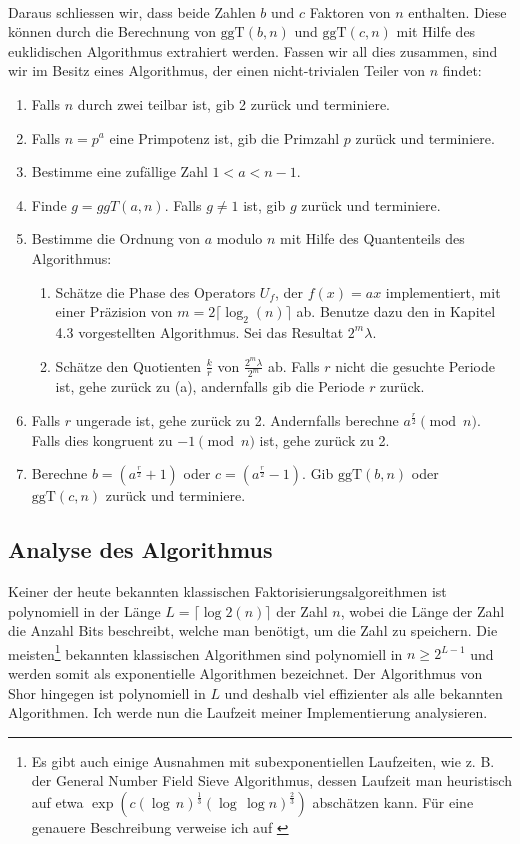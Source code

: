 \paragraph{}
Daraus schliessen wir, dass beide Zahlen $b$ und $c$ Faktoren von $n$ enthalten. Diese können durch die Berechnung von $\text{ggT}(b, n)$ und $\text{ggT}(c, n)$ mit Hilfe des euklidischen Algorithmus extrahiert werden. Fassen wir all dies zusammen, sind wir im Besitz eines Algorithmus, der einen nicht-trivialen Teiler von $n$ findet:
\begin{enumerate}
    \item Falls $n$ durch zwei teilbar ist, gib 2 zurück und terminiere.
    \item Falls $n = p^a$ eine Primpotenz ist, gib die Primzahl $p$ zurück und terminiere.
    \item Bestimme eine zufällige Zahl $1 < a < n - 1$.
    \item Finde $g = ggT(a, n)$. Falls $g \neq 1$ ist, gib $g$ zurück und terminiere.
    \item Bestimme die Ordnung von $a$ modulo $n$ mit Hilfe des Quantenteils des Algorithmus:
    \begin{enumerate}
        \item Schätze die Phase des Operators $U_f$, der $f(x) = ax$ implementiert, mit einer Präzision von $m = 2\lceil \log_2(n) \rceil$ ab. Benutze dazu den in Kapitel 4.3 vorgestellten Algorithmus. Sei das Resultat $2^m\lambda$.
        \item Schätze den Quotienten $\frac{k}{r}$ von $\frac{2^m\lambda}{2^m}$ ab. Falls $r$ nicht die gesuchte Periode ist, gehe zurück zu (a), andernfalls gib die Periode $r$ zurück.
    \end{enumerate}
    \item Falls $r$ ungerade ist, gehe zurück zu 2. Andernfalls berechne $a^{\frac{r}{2}} \pmod{n}$. Falls dies kongruent zu $-1 \pmod{n}$ ist, gehe zurück zu 2.
    \item Berechne $b = (a^\frac{r}{2} + 1)$ oder $c = (a^\frac{r}{2} - 1)$. Gib $\text{ggT}(b, n)$ oder $\text{ggT}(c, n)$ zurück und terminiere.
\end{enumerate}
\subsection{Analyse des Algorithmus}
Keiner der heute bekannten klassischen Faktorisierungsalgoreithmen ist polynomiell in der Länge $L = \lceil \log 2(n) \rceil$ der Zahl $n$, wobei die Länge der Zahl die Anzahl Bits beschreibt, welche man benötigt, um die Zahl zu speichern. Die meisten\footnote{Es gibt auch einige Ausnahmen mit subexponentiellen Laufzeiten, wie z. B. der General Number Field Sieve Algorithmus, dessen Laufzeit man heuristisch auf etwa $\exp\left(c(\log \, n)^\frac{1}{3}(\log \, \log n)^\frac{2}{3}\right)$ abschätzen kann. Für eine genauere Beschreibung verweise ich auf \cite{gnfs}} bekannten klassischen Algorithmen sind polynomiell in $n \geq 2^{L-1}$ und werden somit als exponentielle Algorithmen bezeichnet. Der Algorithmus von Shor hingegen ist polynomiell in $L$ und deshalb viel effizienter als alle bekannten Algorithmen. Ich werde nun die Laufzeit meiner Implementierung analysieren.

